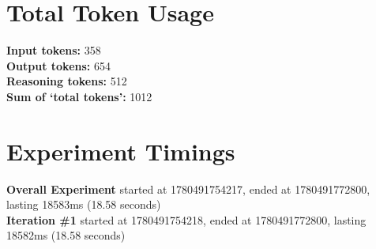 \documentclass{article}
\begin{document}
\section*{Total Token Usage}
\textbf{Input tokens: }358
\\\textbf{Output tokens: }654
\\\textbf{Reasoning tokens: }512
\\\textbf{Sum of `total tokens': }1012
\section*{Experiment Timings}
\textbf{Overall Experiment} started at 1780491754217, ended at 1780491772800, lasting 18583ms (18.58 seconds)
\\\textbf{Iteration \#1} started at 1780491754218, ended at 1780491772800, lasting 18582ms (18.58 seconds)
\end{document}
